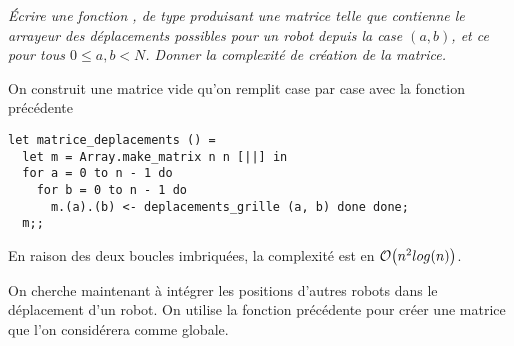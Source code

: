 \begin{Exercise}\it
Écrire une fonction
, de type  produisant une matrice  telle que
 contienne le arrayeur des déplacements possibles pour un
robot depuis la case $(a, b)$, et ce pour tous $0 \leq a,b < N$. Donner
la complexité de création de la matrice.
\end{Exercise}
\begin{Answer}
On construit une matrice vide qu'on remplit case par case avec la fonction précédente
\begin{lstlisting}
let matrice_deplacements () =
  let m = Array.make_matrix n n [||] in
  for a = 0 to n - 1 do 
    for b = 0 to n - 1 do
      m.(a).(b) <- deplacements_grille (a, b) done done;
  m;;
\end{lstlisting}
En raison des deux boucles imbriquées, la complexité est en ${\cal O}\bigl(n^2log(n)\bigr)$.
\end{Answer}

\medskip

On cherche maintenant à intégrer les positions d’autres robots
dans le déplacement d’un robot. On utilise la fonction précédente pour
créer une matrice  que l’on considérera comme
globale.

